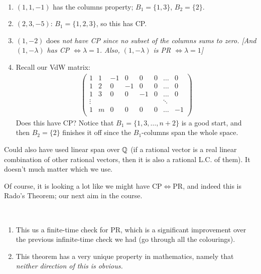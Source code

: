 \documentclass[10pt]{article}
\begin{document}
\begin{remark*}[Examples]\ 
    \begin{enumerate}
        \item $(1,1,-1)$ has the columns property; $B_1 = \{1,3\}$, $B_2 = \{2\}$.
        \item $(2,3,-5)$: $B_1 = \{1,2,3\}$, so this has CP.
        \item $(1,-2)$ does \it{not} have CP since no subset of the columns sums to zero.
        [And $(1,-\lambda)$ has CP $\iff \lambda = 1$. Also, $(1, -\lambda)$ is PR $\iff \lambda = 1$]
        \item Recall our VdW matrix:
        \begin{align*}
            \left(\begin{array}{cccccccc}
                1 & 1 & -1 & 0 & 0 & 0 & \dots & 0\\
                1 & 2 & 0 & -1 & 0 & 0 & \dots & 0\\
                1 & 3 & 0 & 0 & -1 & 0 & \dots & 0\\
                \vdots & & & & & & \ddots & \\
                1 & m & 0 & 0 & 0 & 0 &\dots & -1\\
            \end{array}\right)
        \end{align*}
        Does this have CP? Notice that $B_1 = \{1,3,\dots,n+2\}$ is a good start, and then $B_2 = \{2\}$ finishes it off since the $B_1$-columns span the whole space.
    \end{enumerate}
\end{remark*}

\begin{remark*}
    Could also have used linear span over $\mathbb{Q}$ (if a rational vector is a real linear combination of other rational vectors, then it is also a rational L.C. of them). It doesn't much matter which we use.
\end{remark*}

Of course, it is looking a lot like we might have CP$\iff$PR, and indeed this is Rado's Theorem; our next aim in the course.

\begin{remark*}[Remarks]\ 
    \begin{enumerate}
        \item This us a finite-time check for PR, which is a significant improvement over the previous infinite-time check we had (go through all the colourings).
        \item This theorem has a very unique property in mathematics, namely that \it{neither} direction of this is obvious.
    \end{enumerate}
\end{remark*}
\end{document}
